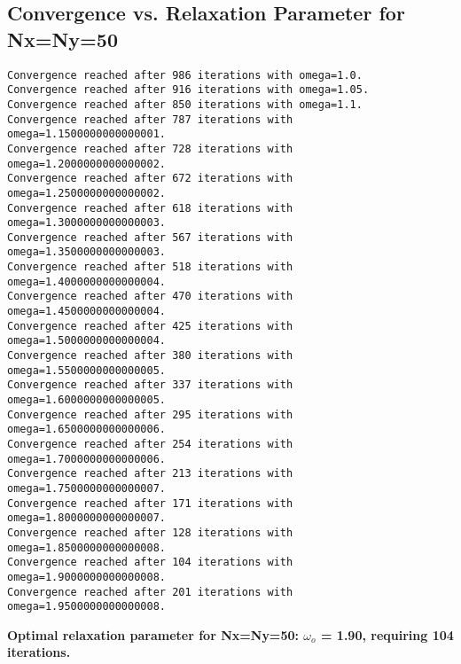 \documentclass[a4paper, twoside]{article}
\begin{document}
\subsection{Convergence vs. Relaxation Parameter for Nx=Ny=50}
\begin{lstlisting}
Convergence reached after 986 iterations with omega=1.0.
Convergence reached after 916 iterations with omega=1.05.
Convergence reached after 850 iterations with omega=1.1.
Convergence reached after 787 iterations with omega=1.1500000000000001.
Convergence reached after 728 iterations with omega=1.2000000000000002.
Convergence reached after 672 iterations with omega=1.2500000000000002.
Convergence reached after 618 iterations with omega=1.3000000000000003.
Convergence reached after 567 iterations with omega=1.3500000000000003.
Convergence reached after 518 iterations with omega=1.4000000000000004.
Convergence reached after 470 iterations with omega=1.4500000000000004.
Convergence reached after 425 iterations with omega=1.5000000000000004.
Convergence reached after 380 iterations with omega=1.5500000000000005.
Convergence reached after 337 iterations with omega=1.6000000000000005.
Convergence reached after 295 iterations with omega=1.6500000000000006.
Convergence reached after 254 iterations with omega=1.7000000000000006.
Convergence reached after 213 iterations with omega=1.7500000000000007.
Convergence reached after 171 iterations with omega=1.8000000000000007.
Convergence reached after 128 iterations with omega=1.8500000000000008.
Convergence reached after 104 iterations with omega=1.9000000000000008.
Convergence reached after 201 iterations with omega=1.9500000000000008.
\end{lstlisting}
\textbf{Optimal relaxation parameter for Nx=Ny=50: $\omega_o$ = 1.90, requiring 104 iterations.}
\end{document}
